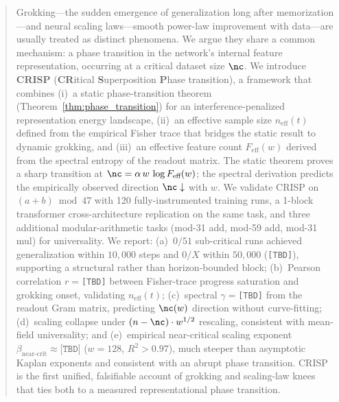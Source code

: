 


\begin{abstract}
Grokking---the sudden emergence of generalization long after memorization---and neural scaling laws---smooth power-law improvement with data---are usually treated as distinct phenomena.
We argue they share a common mechanism: a phase transition in the network's internal feature representation, occurring at a critical dataset size $\nc$.
We introduce \textbf{CRISP} (\textbf{CR}itical \textbf{S}uperposition \textbf{P}hase transition), a framework that combines (i)~a static phase-transition theorem (Theorem~\ref{thm:phase_transition}) for an interference-penalized representation energy landscape, (ii)~an effective sample size $n_{\text{eff}}(t)$ defined from the empirical Fisher trace that bridges the static result to dynamic grokking, and (iii)~an effective feature count $F_{\text{eff}}(w)$ derived from the spectral entropy of the readout matrix.
The static theorem proves a sharp transition at $\nc = \alpha\,w\,\log F_{\text{eff}}(w)$; the spectral derivation predicts the empirically observed direction $\nc \downarrow$ with $w$.
We validate CRISP on $(a+b)\bmod 47$ with 120 fully-instrumented training runs, a 1-block transformer cross-architecture replication on the same task, and three additional modular-arithmetic tasks (mod-31 add, mod-59 add, mod-31 mul) for universality.
We report: (a)~$0/51$ sub-critical runs achieved generalization within $10{,}000$ steps and $0/X$ within $50{,}000$ (\texttt{[TBD]}), supporting a structural rather than horizon-bounded block; (b)~Pearson correlation $r = $\texttt{[TBD]} between Fisher-trace progress saturation and grokking onset, validating $n_{\text{eff}}(t)$; (c)~spectral $\gamma = $\texttt{[TBD]} from the readout Gram matrix, predicting $\nc(w)$ direction without curve-fitting; (d)~scaling collapse under $(n - \nc)\cdot w^{1/2}$ rescaling, consistent with mean-field universality; and (e)~empirical near-critical scaling exponent $\beta_{\text{near-crit}} \approx \texttt{[TBD]}$ ($w=128$, $R^2 > 0.97$), much steeper than asymptotic Kaplan exponents and consistent with an abrupt phase transition.
CRISP is the first unified, falsifiable account of grokking and scaling-law knees that ties both to a measured representational phase transition.
\end{abstract}


